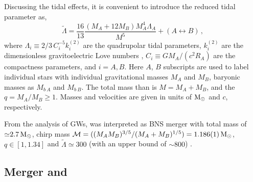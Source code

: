 Discussing the tidal effects, it is convenient to introduce the 
reduced tidal parameter \citep{Favata:2013rwa} as, 
%
\begin{equation}
\tilde\Lambda = \frac{16}{13}\frac{(M_A+12 M_B)M_A^4 \Lambda_A}{M^5}+(A\leftrightarrow B)\, ,
\label{eq:intro:Lambda}
\end{equation}
%
where $\Lambda_i \equiv 2/3\, C_i^{-5} k^{(2)}_i$ are the quadrupolar tidal parameters, 
$k_i^{(2)}$ are the dimensionless gravitoelectric Love numbers \citep{Damour:2009vw}, 
$C_i \equiv GM_A/(c^2R_A)$ are the compactness parameters, and $i=A,B$.
%
Here $A$, $B$ subscripts are used to label individual stars with 
individual gravitational masses $M_A$ and $M_B$, 
baryonic masses as $M_{b~A}$ and $M_{b~B}$.
The total mass than is $M = M_A + M_B$, and the \mr{} $q=M_A/M_B\geq1$. 
%
Masses and velocities are given in units of ${\text{M}_{\odot}}$ and $c$, respectively.
%
%
%
%



From the analysis of \acp{GW}, \GW{} was interpreted as \ac{BNS} merger with total mass of
${\simeq}2.7\,{\text{M}_{\odot}}$, chirp mass $\mathcal{M}=( (M_A M_B)^{3/5} / (M_A + M_B)^{1/5} ) = 1.186(1)\,{\text{M}_{\odot}}$, \mr{} $q\in[1,1.34]$ 
and $\tilde{\Lambda}\simeq300$ (with an upper bound of ${\sim}800$)
\citep{TheLIGOScientific:2017qsa,Abbott:2018wiz,LIGOScientific:2018mvr}.


\subsection{Merger and \pmerg{}}\label{sec:intro:merg_pmerg}

